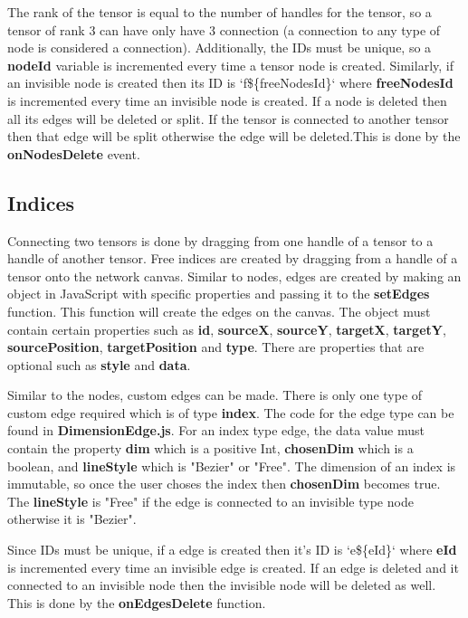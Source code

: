 \documentclass{juliacon}
\begin{document}
\begin{appendix}
The rank of the tensor is equal to the number of handles for the tensor, so a tensor of rank 3 can have only have 3 connection (a connection to any type of node is considered a connection). Additionally, the IDs must be unique, so a \textbf{nodeId} variable is incremented every time a tensor node is created. Similarly, if an invisible node is created then its ID is `f\$\{freeNodesId\}` where \textbf{freeNodesId} is incremented every time an invisible node is created. If a node is deleted then all its edges will be deleted or split. If the tensor is connected to another tensor then that edge will be split otherwise the edge will be deleted.This is done by the \textbf{onNodesDelete} event.

\subsection{Indices}
Connecting two tensors is done by dragging from one handle of a tensor to a handle of another tensor. Free indices are created by dragging from a handle of a tensor onto the network canvas.
Similar to nodes, edges are created by making an object in JavaScript with specific properties and passing it to the \textbf{setEdges} function. This function will create the edges on the canvas. The object must contain certain properties such as \textbf{id}, \textbf{sourceX}, \textbf{sourceY}, \textbf{targetX}, \textbf{targetY}, \textbf{sourcePosition}, \textbf{targetPosition} and \textbf{type}. There are properties that are optional such as \textbf{style} and \textbf{data}.

Similar to the nodes, custom edges can be made. There is only one type of custom edge required which is of type \textbf{index}. The code for the edge type can be found in \textbf{DimensionEdge.js}. For an index type edge, the data value must contain the property \textbf{dim} which is a positive Int, \textbf{chosenDim} which is a boolean, and \textbf{lineStyle} which is "Bezier" or "Free". The dimension of an index is immutable, so once the user choses the index then \textbf{chosenDim} becomes true. The \textbf{lineStyle} is "Free" if the edge is connected to an invisible type node otherwise it is "Bezier".

Since IDs must be unique, if a edge is created then it's ID is `e\$\{eId\}` where \textbf{eId} is incremented every time an invisible edge is created. If an edge is deleted and it connected to an invisible node then the invisible node will be deleted as well. This is done by the \textbf{onEdgesDelete} function.



\end{appendix}
\end{document}
